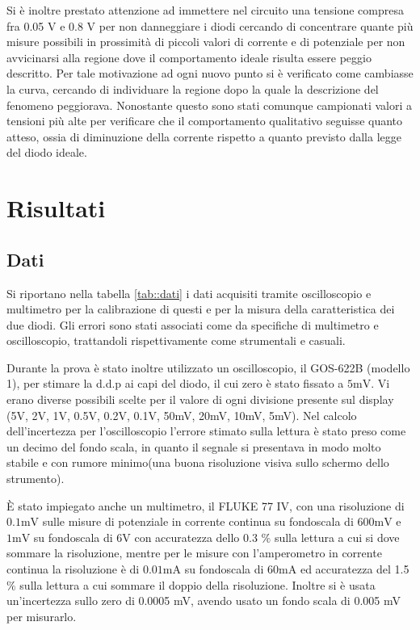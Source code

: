 \documentclass[a4paper,11pt]{article}
\begin{document}
Si è inoltre prestato attenzione ad immettere nel circuito una tensione compresa fra 0.05 V e 0.8 V per non danneggiare i diodi cercando di concentrare quante più misure possibili in prossimità di piccoli valori di corrente e di potenziale per non avvicinarsi alla regione dove il comportamento ideale risulta essere peggio descritto. Per tale motivazione ad ogni nuovo punto si è verificato come cambiasse la curva, cercando di individuare la regione dopo la quale la descrizione del fenomeno peggiorava. Nonostante questo sono stati comunque campionati valori a tensioni più alte per verificare che il comportamento qualitativo seguisse quanto atteso, ossia di diminuzione della corrente rispetto a quanto previsto dalla legge del diodo ideale.


\section{Risultati}

\subsection{Dati}

Si riportano nella tabella \ref{tab::dati} i dati acquisiti tramite oscilloscopio e multimetro per la calibrazione di questi e per la misura della caratteristica dei due diodi. Gli errori sono stati associati come da specifiche di multimetro e oscilloscopio, trattandoli rispettivamente come strumentali e casuali. 

 Durante la prova è stato inoltre utilizzato un oscilloscopio, il GOS-622B (modello 1), per stimare la d.d.p ai capi del diodo, il cui zero è stato fissato a $5 \mathrm{mV}$. Vi erano diverse possibili scelte per il valore di ogni divisione presente sul display (5V, 2V, 1V, 0.5V, 0.2V, 0.1V, 50mV, 20mV, 10mV, 5mV). Nel calcolo dell'incertezza per l'oscilloscopio l'errore stimato sulla lettura è stato preso come un decimo del fondo scala, in quanto il segnale si presentava in modo molto stabile e con rumore minimo(una buona risoluzione visiva sullo schermo dello strumento). 
 
 È stato impiegato anche un multimetro, il FLUKE 77 IV, con una risoluzione di $0.1\mathrm{mV}$ sulle misure di potenziale in corrente continua su fondoscala di $600\mathrm{mV}$ e $1\mathrm{mV}$ su fondoscala di $6\mathrm{V}$ con accuratezza dello 0.3 $\%$ sulla lettura a cui si dove sommare la risoluzione, mentre per le misure con l'amperometro in corrente continua la risoluzione è di $0.01\mathrm{mA}$ su fondoscala di $60\mathrm{mA}$ ed accuratezza del 1.5 $\%$ sulla lettura a cui sommare il doppio della risoluzione. Inoltre si è usata un'incertezza sullo zero di 0.0005 mV, avendo usato un fondo scala di 0.005 mV per misurarlo. 
\end{document}
